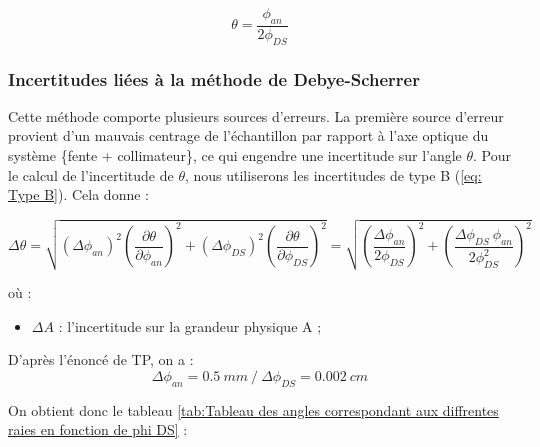 \begin{equation}
	\theta = \frac{\phi_{an}}{2\phi_{DS}}
\end{equation}

\newpage



\subsubsection{Incertitudes liées à la méthode de Debye-Scherrer}

Cette méthode comporte plusieurs sources d'erreurs. La première source d'erreur provient d'un mauvais centrage de l'échantillon par rapport à l'axe optique du système \{fente + collimateur\}, ce qui engendre une incertitude sur l'angle $\theta$. Pour le calcul de l'incertitude de $\theta$, nous utiliserons les incertitudes de type B (\ref{eq: Type B}). Cela donne :

\begin{equation}\label{eq:TypeB_theta}
	\Delta \theta = \sqrt{\left ( \Delta \phi_{an} \right )^2 \left ( \frac{\partial \theta}{\partial \phi_{an}} \right )^2 + \left ( \Delta \phi_{DS} \right )^2 \left ( \frac{\partial \theta}{\partial \phi_{DS}} \right )^2 }  =  \sqrt{\left ( \frac{\Delta \phi_{an}}{2\phi_{DS}} \right )^2 + \left ( \frac{\Delta \phi_{DS} \ \phi_{an}}{2\phi_{DS}^2} \right )^2 }
\end{equation}

où :

\begin{itemize}

	
	\item $\Delta A$ : l'incertitude sur la grandeur physique A ;
	

	

	

\end{itemize}

D'après l'énoncé de TP, on a :
\begin{equation}
	\Delta \phi_{an} = 0.5 \ mm  \ / \ \Delta \phi_{DS} = 0.002 \ cm
\end{equation}

On obtient donc le tableau \ref{tab:Tableau des angles correspondant aux diffrentes raies en fonction de phi DS} : 










